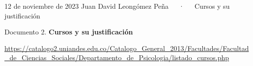 \documentclass[11pt,a4paper,]{awesome-cv}
\begin{document}
\makecvheader

\makecvfooter
  {12 de noviembre de 2023}
    {Juan David Leongómez Peña~~~·~~~Cursos y su justificación}
  {\thepage}





\vspace{4mm}
\begin{tcolorbox}[enhanced,
        on line, 
        boxsep=4pt, left=0pt,right=0pt,top=0pt,bottom=0pt,
        colframe=white,colback=black]
  
\color{white}
\begin{LARGE}\begin{center}
Documento 2. \textbf{ Cursos y su justificación}
\end{center}\end{LARGE}
\end{tcolorbox}

\url{https://catalogo2.uniandes.edu.co/Catalogo_General_2013/Facultades/Facultad_de_Ciencias_Sociales/Departamento_de_Psicologia/listado_cursos.php}
\end{document}
